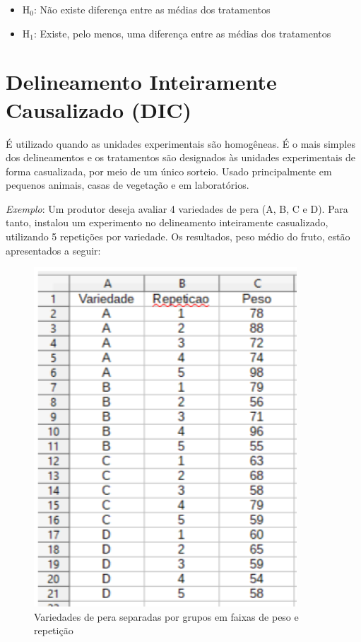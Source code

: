 \documentclass[12pt,brazil,oneside]{book}
\begin{document}
\begin{itemize}
\item
  H\(_0\): Não existe diferença entre as médias dos tratamentos
\item
  H\(_1\): Existe, pelo menos, uma diferença entre as médias dos tratamentos
\end{itemize}

\hypertarget{delineamento-inteiramente-causalizado-dic}{%
\section{Delineamento Inteiramente Causalizado (DIC)}\label{delineamento-inteiramente-causalizado-dic}}

É utilizado quando as unidades experimentais são homogêneas. É o mais simples dos delineamentos e os tratamentos são designados às unidades experimentais de forma casualizada, por meio de um único sorteio. Usado principalmente em pequenos animais, casas de vegetação e em
laboratórios.

\emph{Exemplo}: Um produtor deseja avaliar 4 variedades de pera (A, B, C e D). Para tanto, instalou um experimento no delineamento inteiramente casualizado, utilizando 5 repetições por variedade. Os resultados, peso médio do fruto, estão apresentados a seguir:

\begin{figure}[H]

{\centering \includegraphics[width=0.8\linewidth]{delimexp0} 

}

\caption{Variedades de pera separadas por grupos em faixas de peso e repetição}\label{fig:unnamed-chunk-9}
\end{figure}
\end{document}
